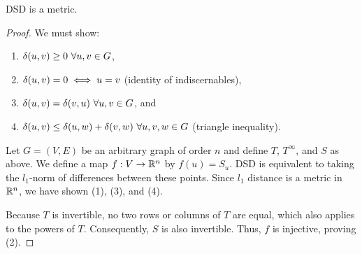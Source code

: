 \begin{theorem}
  DSD is a metric.
\end{theorem}
\begin{proof}
  We must show:

  \begin{enumerate}
  \item $\delta(u,v)\geq 0 ~ \forall u,v \in G$,
  \item $\delta(u,v) = 0 \iff u = v$ (identity of indiscernables),
  \item $\delta(u,v) = \delta(v,u) ~\forall u,v \in G$, and
  \item $\delta(u,v) \leq \delta(u,w) + \delta(v,w) ~\forall u,v,w \in G$
    (triangle inequality).
  \end{enumerate}

  Let $G = (V,E)$ be an arbitrary graph of order $n$ and define $T$, $T^\infty$,
  and $S$ as above. We define a map $f : V \to \mathbb{R}^n$ by $f(u) = S_u$. DSD is
  equivalent to taking the $l_1$-norm of differences between these points. Since
  $l_1$ distance is a metric in $\mathbb{R}^n$, we have shown (1), (3), and (4).

  Because $T$ is invertible, no two rows or columns of $T$ are equal, which also
  applies to the powers of $T$. Consequently, $S$ is also invertible. Thus,
  $f$ is injective, proving (2).




\end{proof}



